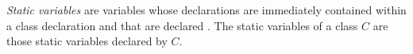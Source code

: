 \documentclass{article}
\newcommand{\code}[1]{{\sf #1}}
\begin{document}
\LMHash{}
{\em Static variables} are variables whose declarations are immediately contained within a class declaration and that are declared \STATIC{}. The static variables of a class $C$ are those static variables declared by $C$.















\end{document}

